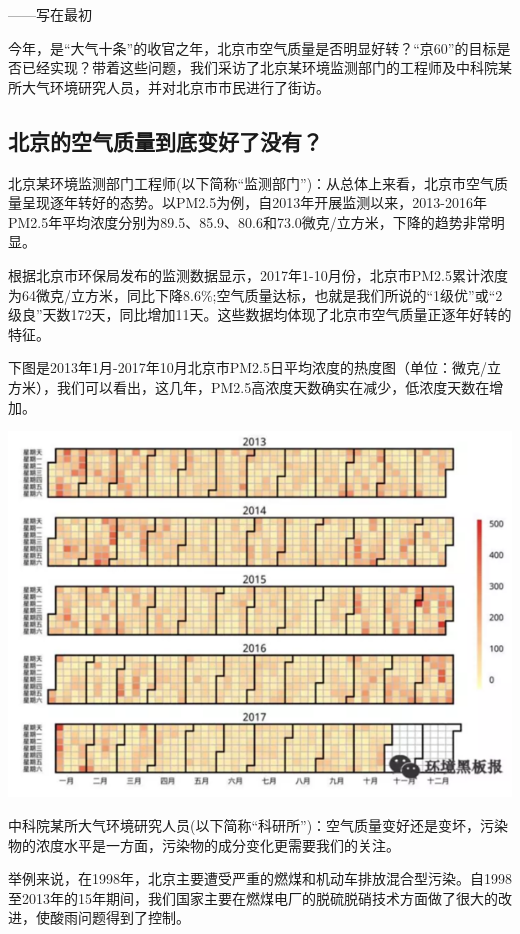\documentclass[]{book}
\begin{document}
------写在最初

今年，是``大气十条''的收官之年，北京市空气质量是否明显好转？``京60''的目标是否已经实现？带着这些问题，我们采访了北京某环境监测部门的工程师及中科院某所大气环境研究人员，并对北京市市民进行了街访。

\subsection{北京的空气质量到底变好了没有？}

北京某环境监测部门工程师(以下简称``监测部门'')：从总体上来看，北京市空气质量呈现逐年转好的态势。以PM2.5为例，自2013年开展监测以来，2013-2016年PM2.5年平均浓度分别为89.5、85.9、80.6和73.0微克/立方米，下降的趋势非常明显。

根据北京市环保局发布的监测数据显示，2017年1-10月份，北京市PM2.5累计浓度为64微克/立方米，同比下降8.6\%;空气质量达标，也就是我们所说的``1级优''或``2级良''天数172天，同比增加11天。这些数据均体现了北京市空气质量正逐年好转的特征。

下图是2013年1月-2017年10月北京市PM2.5日平均浓度的热度图（单位：微克/立方米），我们可以看出，这几年，PM2.5高浓度天数确实在减少，低浓度天数在增加。

\includegraphics[width=8.33in]{images/air1}

中科院某所大气环境研究人员(以下简称``科研所'')：空气质量变好还是变坏，污染物的浓度水平是一方面，污染物的成分变化更需要我们的关注。

举例来说，在1998年，北京主要遭受严重的燃煤和机动车排放混合型污染。自1998至2013年的15年期间，我们国家主要在燃煤电厂的脱硫脱硝技术方面做了很大的改进，使酸雨问题得到了控制。
\end{document}

